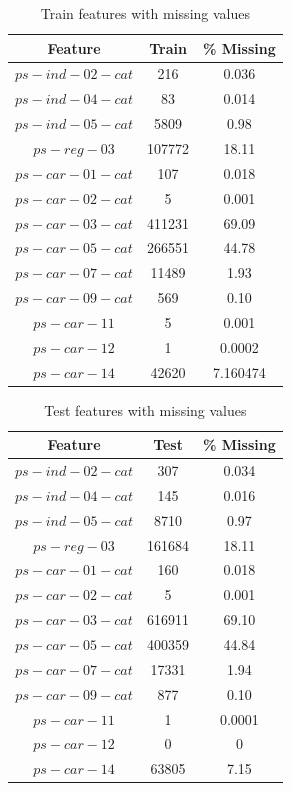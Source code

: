 \documentclass[fleqn,10pt]{SelfArx} %
\begin{document}
\begin{table}[ht]
\caption{Train features with missing values} %
\centering %
\begin{tabular}{c c c } %
\hline\hline %
Feature & Train & \% Missing\\ [0.5ex] %
\hline %
$ps-ind-02-cat$ & 216 & 0.036\\
$ps-ind-04-cat$ & 83 & 0.014\\
$ps-ind-05-cat$ & 5809 & 0.98\\
$ps-reg-03$ & 107772 & 18.11\\
$ps-car-01-cat$ & 107 & 0.018\\
$ps-car-02-cat$ & 5 & 0.001\\
$ps-car-03-cat$ & 411231 & 69.09\\
$ps-car-05-cat$ & 266551 & 44.78\\
$ps-car-07-cat$ & 11489 & 1.93\\
$ps-car-09-cat$ & 569 & 0.10\\
$ps-car-11$ & 5 & 0.001\\
$ps-car-12$ & 1 & 0.0002\\
$ps-car-14$ & 42620 & 7.160474\\ [1ex] %
\hline %
\end{tabular}
\label{table:nonlin} %
\end{table}
\begin{table}[ht]
\caption{Test features with missing values } %
\centering %
\begin{tabular}{c c c} %
\hline\hline %
Feature & Test & \% Missing \\ [0.5ex] %
\hline %
$ps-ind-02-cat$ & 307 & 0.034\\
$ps-ind-04-cat$ & 145 & 0.016\\
$ps-ind-05-cat$ & 8710 & 0.97\\
$ps-reg-03$ & 161684 & 18.11\\
$ps-car-01-cat$ & 160 & 0.018\\
$ps-car-02-cat$ & 5 & 0.001\\
$ps-car-03-cat$ & 616911 & 69.10\\
$ps-car-05-cat$ & 400359 & 44.84\\
$ps-car-07-cat$ & 17331 & 1.94\\
$ps-car-09-cat$ & 877 & 0.10\\
$ps-car-11$ & 1 & 0.0001\\
$ps-car-12$ & 0 & 0\\
$ps-car-14$ & 63805 & 7.15\\ [1ex] %
\hline %
\end{tabular}
\label{table:nonlin} %
\end{table}
\end{document}
